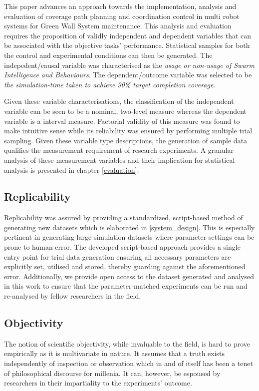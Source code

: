 \documentclass{report}
\begin{document}
This paper advances an approach towards the implementation, analysis and evaluation of coverage path planning and coordination control in multi robot systems for Green Wall System maintenance. This analysis and evaluation requires the proposition of validly independent and dependent variables that can be associated with the objective tasks' performance. Statistical samples for both the control and experimental conditions can then be generated. The indepedent/causal variable was characterised as the \textit{usage or non-usage of Swarm Intelligence and Behaviours}. The dependent/outcome variable was selected to be \textit{the simulation-time taken to achieve 90\% target completion coverage}.

Given these variable characterisations, the classification of the independent variable can be seen to be a nominal, two-level measure whereas the dependent variable is a interval measure. Factorial validity of this measure was found to make intuitive sense \cite{Field2012} while its reliability was ensured by performing multiple trial sampling. Given these variable type descriptions, the generation of sample data qualifies the measurement requirement of research experiments. A granular analysis of these measurement variables and their implication for statistical analysis is presented in chapter \ref{evaluation}.

\subsection{Replicability}

Replicability was assured by providing a standardized, script-based method of generating new datasets which is elaborated in \ref{system_design}. This is especially pertinent in generating large simulation datasets where parameter settings can be prone to human error. The developed script-based approach provides a single entry point for trial data generation ensuring all necessary parameters are explicitly set, utilised and stored, thereby guarding against the aforementioned error. Additionally, we provide open access to the dataset generated and analysed in this work to ensure that the parameter-matched experiments can be run and re-analysed by fellow researchers in the field.

\subsection{Objectivity}

The notion of scientific objectivity, while invaluable to the field, is hard to prove empirically as it is multivariate in nature. It assumes that a truth exists independently of inspection or observation which in and of itself has been a tenet of philosophical discourse for millenia. It can, however, be espoused by researchers in their impartiality to the experiments' outcome.
\end{document}
